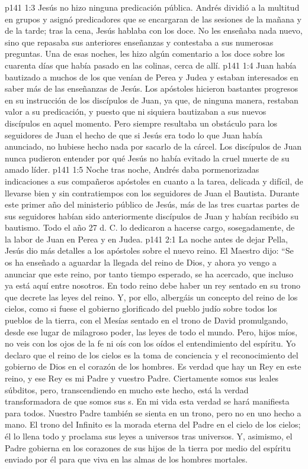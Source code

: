 \vs p141 1:3 Jesús no hizo ninguna predicación pública. Andrés dividió a la multitud en grupos y asignó predicadores que se encargaran de las sesiones de la mañana y de la tarde; tras la cena, Jesús hablaba con los doce. No les enseñaba nada nuevo, sino que repasaba sus anteriores enseñanzas y contestaba a sus numerosas preguntas. Una de esas noches, les hizo algún comentario a los doce sobre los cuarenta días que había pasado en las colinas, cerca de allí.
\vs p141 1:4 Juan había bautizado a muchos de los que venían de Perea y Judea y estaban interesados en saber más de las enseñanzas de Jesús. Los apóstoles hicieron bastantes progresos en su instrucción de los discípulos de Juan, ya que, de ninguna manera, restaban valor a su predicación, y puesto que ni siquiera bautizaban a sus nuevos discípulos en aquel momento. Pero siempre resultaba un obstáculo para los seguidores de Juan el hecho de que si Jesús era todo lo que Juan había anunciado, no hubiese hecho nada por sacarlo de la cárcel. Los discípulos de Juan nunca pudieron entender por qué Jesús no había evitado la cruel muerte de su amado líder.
\vs p141 1:5 Noche tras noche, Andrés daba pormenorizadas indicaciones a sus compañeros apóstoles en cuanto a la tarea, delicada y difícil, de llevarse bien y sin contratiempos con los seguidores de Juan el Bautista. Durante este primer año del ministerio público de Jesús, más de las tres cuartas partes de sus seguidores habían sido anteriormente discípulos de Juan y habían recibido su bautismo. Todo el año 27 d. C. lo dedicaron a hacerse cargo, sosegadamente, de la labor de Juan en Perea y en Judea.
\vs p141 2:1 La noche antes de dejar Pella, Jesús dio más detalles a los apóstoles sobre el nuevo reino. El Maestro dijo: “Se os ha enseñado a aguardar la llegada del reino de Dios, y ahora yo vengo a anunciar que este reino, por tanto tiempo esperado, se ha acercado, que incluso ya está aquí entre nosotros. En todo reino debe haber un rey sentado en su trono que decrete las leyes del reino. Y, por ello, albergáis un concepto del reino de los cielos, como si fuese el gobierno glorificado del pueblo judío sobre todos los pueblos de la tierra, con el Mesías sentado en el trono de David promulgando, desde ese lugar de milagroso poder, las leyes de todo el mundo. Pero, hijos míos, no veis con los ojos de la fe ni oís con los oídos el entendimiento del espíritu. Yo declaro que el reino de los cielos es la toma de conciencia y el reconocimiento del gobierno de Dios en el corazón de los hombres. Es verdad que hay un Rey en este reino, y ese Rey es mi Padre y vuestro Padre. Ciertamente somos sus leales súbditos, pero, transcendiendo en mucho este hecho, está la verdad transformadora de que somos sus s. En mi vida esta verdad se hará manifiesta para todos. Nuestro Padre también se sienta en un trono, pero no en uno hecho a mano. El trono del Infinito es la morada eterna del Padre en el cielo de los cielos; él lo llena todo y proclama sus leyes a universos tras universos. Y, asimismo, el Padre gobierna en los corazones de sus hijos de la tierra por medio del espíritu enviado por él para que viva en las almas de los hombres mortales.
